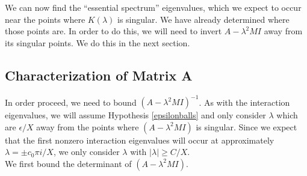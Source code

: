 \documentclass[thesis.tex]{subfiles}
\begin{document}
We can now find the ``essential spectrum'' eigenvalues, which we expect to occur near the points where $K(\lambda)$ is singular. We have already determined where those points are. In order to do this, we will need to invert $A - \lambda^2 MI$ away from its singular points. We do this in the next section.

\subsection{Characterization of Matrix A }

In order proceed, we need to bound $(A - \lambda^2 MI)^{-1}$. As with the interaction eigenvalues, we will assume Hypothesis \ref{epsilonballs} and only consider $\lambda$ which are $\epsilon/X$ away from the points where $(A - \lambda^2 MI)$ is singular. Since we expect that the first nonzero interaction eigenvalues will occur at approximately $\lambda = \pm c_0 \pi i / X$, we only consider $\lambda$ with $|\lambda| \geq C/X$.\\

We first bound the determinant of $(A - \lambda^2 MI)$. 

\end{document}
